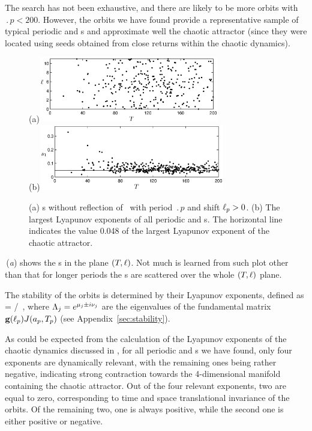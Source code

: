 The search has not been exhaustive, and there are likely to be more
orbits with $\period{p} < 200$.
However, the orbits we have found provide a representative sample of
typical periodic and \rpo s and approximate well the chaotic
attractor (since they were located using seeds obtained from close
returns within the chaotic dynamics).

\begin{figure}[t]
\begin{center}
(a)\hspace{1ex}\includegraphics[width=0.7\textwidth]{figs/ks22_rpos_Tdelta.eps}\\
(b)\includegraphics[width=0.72\textwidth]{figs/ks22_rpos_lyap.eps}
\end{center}
\caption{
(a) \Rpo s without reflection of \KSe\ with period $\period{p}$ and 
shift $\shift_p > 0$.
(b) The largest Lyapunov exponents  of all periodic
and \rpo s.  The horizontal line indicates the value 0.048 of the largest
Lyapunov exponent of the chaotic attractor.
} \label{f:ks22rposT}
\end{figure}

\,(\textit{a}) shows the \rpo s in the plane
$(\period{},\shift)$.  Not much is learned from such plot other than
that for longer periods the \rpo s are scattered over the
whole $(\period{},\shift)$ plane.

The stability of the orbits is determined by their Lyapunov exponents,
defined as
\beq
{} = \eigRe[j]/ \,,
where $\ExpaEig_j = e^{\eigRe[j] \pm i \eigIm[j]}$ are the
eigenvalues of the fundamental matrix $\mathbf{g}(\shift_p)J(a_p,\period{p})$ 
(see Appendix~\ref{sec:stability}).

As could be expected from the calculation of the Lyapunov exponents
of the chaotic dynamics discussed in , for all
periodic and \rpo s we have found, only four 
exponents are dynamically relevant, with the remaining ones being
rather negative, indicating strong contraction towards the
4-dimensional manifold containing the chaotic attractor.  Out of the
four relevant exponents, two are equal to zero, corresponding to
time and space translational invariance of the orbits.  Of the
remaining two, one is always positive, while the second one is
either positive or negative.

